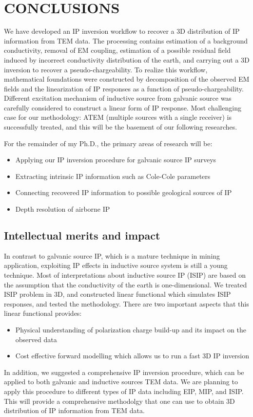 \documentclass[letterpaper,11pt]{article}
\begin{document}
\section{CONCLUSIONS}
We have developed an IP inversion workflow to recover a 3D distribution of IP information from TEM data. The processing contains estimation of a background conductivity, removal of EM coupling, estimation of a possible residual field induced by incorrect conductivity distribution of the earth, and carrying out a 3D inversion to recover a pseudo-chargeability. To realize this workflow, mathematical foundations were constructed by decomposition of the observed EM fields and the linearization of IP responses as a function of pseudo-chargeability. Different excitation mechanism of inductive source from galvanic source was carefully considered to construct a linear form of IP response. Most challenging case for our methodology: ATEM (multiple sources with a single receiver) is successfully treated, and this will be the basement of our following researches. 

For the remainder of my Ph.D., the primary areas of research will be:
\begin{itemize}
  \item Applying our IP inversion procedure for galvanic source IP surveys
  \item Extracting intrinsic IP information such as Cole-Cole parameters
  \item Connecting recovered IP information to possible geological sources of IP
  \item Depth resolution of airborne IP
\end{itemize}

\subsection{Intellectual merits and impact}
In contrast to galvanic source IP, which is a mature technique in mining application, exploiting IP effects in inductive source system is still a young technique. Most of interpretations about inductive source IP (ISIP) are based on the assumption that the conductivity of the earth is  one-dimensional. We treated ISIP problem in 3D, and constructed linear functional which simulates ISIP responses, and tested the methodology. There are two important aspects that this linear functional provides:
\begin{itemize}
  \item Physical understanding of polarization charge build-up and its impact on the observed data
  \item Cost effective forward modelling which allows us to run a fast 3D IP inversion
\end{itemize}
In addition,  we suggested a comprehensive IP inversion procedure, which can be applied to both galvanic and inductive sources TEM data. We are planning to apply this procedure to different types of IP data including EIP, MIP, and ISIP. This will provide a comprehensive methodolgy  that one can use to obtain 3D distribution of IP information from TEM data.
\end{document}
